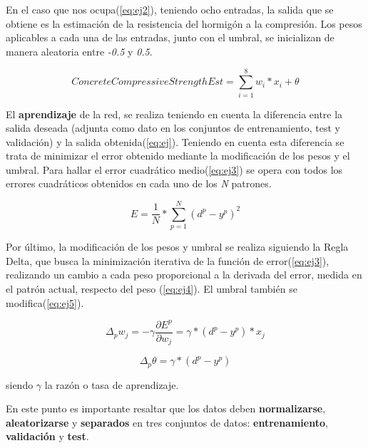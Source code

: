 \documentclass[11pt,spanish,listoffigures,listoftables]{workluis}
\begin{document}
\par En el caso que nos ocupa(\ref{eq:ej2}), teniendo ocho entradas, la salida que se obtiene es la estimación de la resistencia del hormigón a la compresión. Los pesos aplicables a cada una de las entradas, junto con el umbral, se inicializan de manera aleatoria entre \textit{-0.5} y \textit{0.5}.

\begin{equation}\label{eq:ej2}
ConcreteCompressiveStrengthEst = \sum_{i=1}^{8}w_{i}*x_{i} + \theta
\end{equation}

\par El \textbf{aprendizaje} de la red, se realiza teniendo en cuenta la diferencia entre la salida deseada (adjunta como dato en los conjuntos de entrenamiento, test y validación) y la salida obtenida(\ref{eq:ej}). Teniendo en cuenta esta diferencia se trata de minimizar el error obtenido mediante la modificación de los pesos y el umbral. Para hallar el error cuadrático medio(\ref{eq:ej3}) se opera con todos los errores cuadráticos obtenidos en cada uno de los \textit{N} patrones. 

\begin{equation}\label{eq:ej3}
E = \frac{1}{N}* \sum_{p=1}^{N}(d^{p} - y^{p})^{2}
\end{equation}

\par Por último, la modificación de los pesos y umbral se realiza siguiendo la Regla Delta, que busca la minimización iterativa de la función de error(\ref{eq:ej3}), realizando un cambio a cada peso proporcional a la derivada del error, medida en el patrón actual, respecto del peso (\ref{eq:ej4}). El umbral también se modifica(\ref{eq:ej5}).

\begin{equation}\label{eq:ej4}
\Delta_{p}w_{j} = -\gamma\frac{\partial E^{p}}{\partial w_{j}} = \gamma*(d^{p} - y^{p})*x_{j}
\end{equation} 

\begin{equation}\label{eq:ej5}
\Delta_{p}\theta = \gamma*(d^{p} - y^{p})
\end{equation}

\par siendo $\gamma$ la razón o tasa de aprendizaje.

\par En este punto es importante resaltar que los datos deben \textbf{normalizarse}, \textbf{aleatorizarse} y \textbf{separados} en tres conjuntos de datos: \textbf{entrenamiento}, \textbf{validación} y \textbf{test}.
\end{document}
